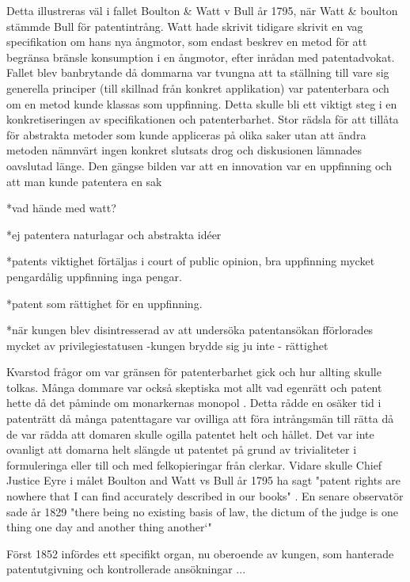 Detta illustreras väl i fallet Boulton \& Watt v Bull år 1795, när Watt \& boulton stämmde Bull för patentintrång. Watt hade skrivit tidigare skrivit en vag specifikation om hans nya ångmotor, som endast beskrev en metod för att begränsa bränsle konsumption i en ångmotor, efter inrådan med patentadvokat\cite{bracha}. Fallet blev banbrytande då dommarna var tvungna att ta ställning till vare sig generella principer (till skillnad från konkret applikation) var patenterbara och om en metod kunde klassas som uppfinning\cite{bracha}. Detta skulle bli ett viktigt steg i en konkretiseringen av specifikationen och patenterbarhet. Stor rädsla för att tillåta för abstrakta metoder som kunde appliceras på olika saker utan att ändra metoden nämnvärt ingen konkret slutsats drog och diskusionen lämnades oavslutad länge. Den gängse bilden var att en innovation var en uppfinning och att man kunde patentera en sak \cite{bracha}

*vad hände med watt?

*ej patentera naturlagar och abstrakta idéer 

*patents viktighet förtäljas i court of public opinion, bra uppfinning mycket pengardålig uppfinning inga pengar.

*patent som rättighet för en uppfinning.

*när kungen blev disintresserad av att undersöka patentansökan fförlorades mycket av privilegiestatusen -kungen brydde sig ju inte - rättighet


Kvarstod frågor om var gränsen för patenterbarhet gick och hur allting skulle tolkas\cite{bracha}. Många dommare var också skeptiska mot allt vad egenrätt och patent hette då det påminde om monarkernas monopol \cite{macleod ??? }.
Detta rådde en osäker tid i patenträtt då många patenttagare var ovilliga att föra intrångsmän till
rätta då de var rädda att domaren skulle ogilla patentet helt och hållet. Det var inte ovanligt att
domarna helt slängde ut patentet på grund av trivialiteter i formuleringa eller till och med
felkopieringar från clerkar\cite{macleod}. Vidare skulle Chief Justice Eyre i målet Boulton and Watt vs Bull år 1795 ha sagt "patent rights are nowhere that I can find accurately described in our books" \cite{macleod}. En senare observatör sade år 1829 "there being no existing basis of law, the dictum of the judge is 
one thing one day and another thing another‘" \cite{macleod}

Först 1852 infördes ett specifikt organ, nu oberoende av kungen, som hanterade patentutgivning och kontrollerade ansökningar ...

